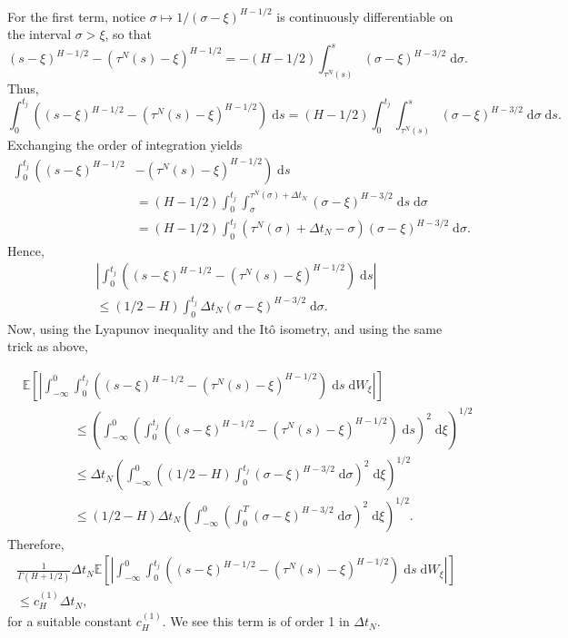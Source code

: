 \documentclass[reqno,12pt]{amsart}
\theoremstyle{plain} %
\theoremstyle{definition} %
\begin{document}
For the first term, notice $\sigma \mapsto 1/(\sigma - \xi)^{H-1/2}$ is continuously differentiable on the interval $\sigma > \xi$, so that
\[
    (s-\xi)^{H-1/2} - (\tau^N(s)-\xi)^{H-1/2} = - (H-1/2)\int_{\tau^N(s)}^s (\sigma - \xi)^{H - 3/2} \;\mathrm{d}\sigma.
\]
Thus,
\[
    \int_{0}^{t_j} \left( (s-\xi)^{H-1/2} - (\tau^N(s)-\xi)^{H-1/2}\right) \;\mathrm{d}s = (H-1/2)\int_{0}^{t_j} \int_{\tau^N(s)}^s (\sigma - \xi)^{H - 3/2} \;\mathrm{d}\sigma \;\mathrm{d}s.
\]
Exchanging the order of integration yields
\begin{align*}
    \int_{0}^{t_j} \left( (s-\xi)^{H-1/2} \right. & \left. - (\tau^N(s)-\xi)^{H-1/2} \right) \;\mathrm{d}s \\
    & = (H-1/2)\int_{0}^{t_j} \int_{\sigma}^{\tau^N(\sigma) + \Delta t_N} (\sigma - \xi)^{H - 3/2} \;\mathrm{d}s \;\mathrm{d}\sigma \\
    & = (H-1/2)\int_{0}^{t_j} \left(\tau^N(\sigma) + \Delta t_N - \sigma\right) (\sigma - \xi)^{H - 3/2} \;\mathrm{d}\sigma.
\end{align*}
Hence,
\begin{multline*}
    \left|\int_{0}^{t_j} \left( (s-\xi)^{H-1/2} - (\tau^N(s)-\xi)^{H-1/2} \right) \;\mathrm{d}s\right| \\
    \leq (1/2 - H)\int_{0}^{t_j} \Delta t_N (\sigma - \xi)^{H - 3/2} \;\mathrm{d}\sigma.
\end{multline*}
Now, using the Lyapunov inequality and the It\^o isometry, and using the same trick as above,

\begin{align*}
    & \mathbb{E}\left[\left|\int_{-\infty}^{0} \int_{0}^{t_j} \left( (s-\xi)^{H-1/2} - (\tau^N(s)-\xi)^{H-1/2}\right) \;\mathrm{d}s \;\mathrm{d}W_\xi \right|\right] \\
    & \qquad\qquad \leq \left(\int_{-\infty}^{0} \left(\int_{0}^{t_j} \left( (s-\xi)^{H-1/2} - (\tau^N(s)-\xi)^{H-1/2}\right) \;\mathrm{d}s \right)^2 \;\mathrm{d}\xi \right)^{1/2} \\
    & \qquad\qquad \leq \Delta t_N \left(\int_{-\infty}^{0} \left( (1/2 - H)\int_0^{t_j} (\sigma - \xi)^{H-3/2} \;\mathrm{d}\sigma \right)^2 \;\mathrm{d}\xi \right)^{1/2} \\
    & \qquad\qquad \leq (1/2 - H)\Delta t_N \left(\int_{-\infty}^{0} \left(\int_0^T (\sigma - \xi)^{H-3/2} \;\mathrm{d}\sigma \right)^2 \;\mathrm{d}\xi \right)^{1/2}.
\end{align*}
Therefore,
\begin{multline}
    \label{firsttermfBm}
    \frac{1}{\Gamma(H + 1/2)}\Delta t_N \mathbb{E}\left[\left|\int_{-\infty}^{0} \int_{0}^{t_j} \left( (s-\xi)^{H-1/2} - (\tau^N(s)-\xi)^{H-1/2}\right) \;\mathrm{d}s \;\mathrm{d}W_\xi \right|\right] \\
    \leq c_H^{(1)}\Delta t_N,
\end{multline}
for a suitable constant $c_H^{(1)}$. We see this term is of order 1 in $\Delta t_N.$
\end{document}
